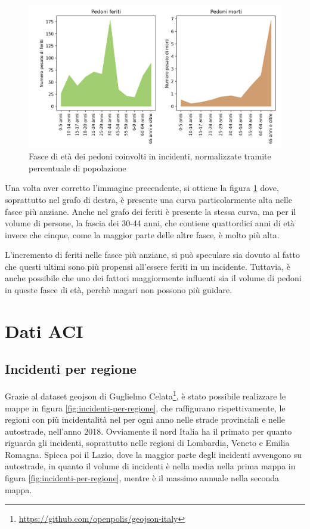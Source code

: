 \documentclass[a4paper]{report}
\begin{document}
\begin{figure}
    \includegraphics[width=\linewidth]{../src/incidenti/incidenti_senza_coords/pedoni/eta_pedoni_norm.png}
    \caption{Fasce di età dei pedoni coinvolti in incidenti, normalizzate tramite percentuale di popolazione}
    \label{fig:eta-pedoni-norm}
\end{figure}

Una volta aver corretto l'immagine precendente, si ottiene la figura \ref{fig:eta-pedoni-norm} 
dove, soprattutto nel grafo di destra, è presente una curva particolarmente alta 
nelle fasce più anziane.
Anche nel grafo dei feriti è presente la stessa curva, ma per il volume di persone, la fascia 
dei 30-44 anni, che contiene quattordici anni di età invece che cinque, come 
la maggior parte delle altre fasce, è molto più alta.

L'incremento di feriti nelle fasce più anziane, si può speculare sia dovuto al fatto che 
questi ultimi sono più propensi all'essere feriti in un incidente. 
Tuttavia, è anche possibile che uno dei fattori maggiormente influenti sia il 
volume di pedoni in queste fasce di età, perchè magari non possono più guidare.

\section{Dati ACI}


\subsection{Incidenti per regione}

Grazie al dataset geojson di Guglielmo Celata\footnote{\url{https://github.com/openpolis/geojson-italy}}, 
è stato possibile realizzare le mappe in figura \ref{fig:incidenti-per-regione}, 
che raffigurano rispettivamente, le regioni con più incidentalità nel per ogni anno nelle 
strade provinciali e nelle autostrade, nell'anno 2018.
Ovviamente il nord Italia ha il primato per quanto riguarda gli incidenti, soprattutto nelle regioni 
di Lombardia, Veneto e Emilia Romagna. 
Spicca poi il Lazio, dove la maggior parte degli incidenti avvengono su autostrade, in quanto il volume 
di incidenti è nella media nella prima mappa in figura \ref{fig:incidenti-per-regione}, mentre è il massimo annuale nella 
seconda mappa.
\end{document}
